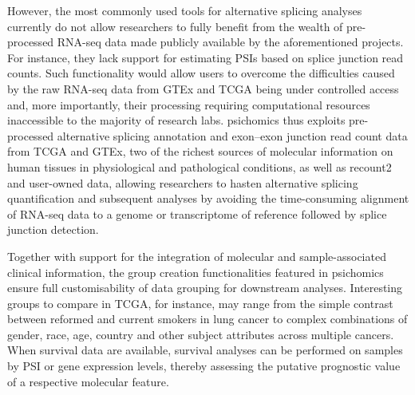 However, the most commonly used tools for alternative splicing analyses currently do not allow researchers to fully benefit from the wealth of pre-processed RNA-seq data made publicly available by the aforementioned projects. For instance, they lack support for estimating PSIs based on splice junction read counts. Such functionality would allow users to overcome the difficulties caused by the raw RNA-seq data from GTEx and TCGA being under controlled access and, more importantly, their processing requiring computational resources inaccessible to the majority of research labs. psichomics thus exploits pre-processed alternative splicing annotation and exon–exon junction read count data from TCGA and GTEx, two of the richest sources of molecular information on human tissues in physiological and pathological conditions, as well as recount2 and user-owned data, allowing researchers to hasten alternative splicing quantification and subsequent analyses by avoiding the time-consuming alignment of RNA-seq data to a genome or transcriptome of reference followed by splice junction detection.

Together with support for the integration of molecular and sample-associated clinical information, the group creation functionalities featured in psichomics ensure full customisability of data grouping for downstream analyses. Interesting groups to compare in TCGA, for instance, may range from the simple contrast between reformed and current smokers in lung cancer to complex combinations of gender, race, age, country and other subject attributes across multiple cancers. When survival data are available, survival analyses can be performed on samples by PSI or gene expression levels, thereby assessing the putative prognostic value of a respective molecular feature.


